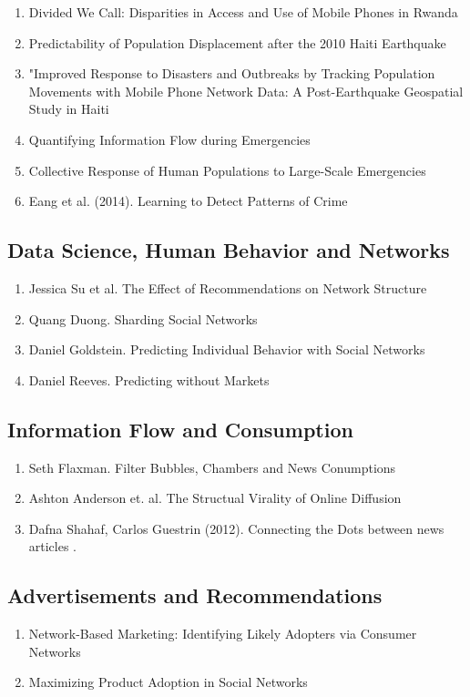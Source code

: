 \begin{enumerate}
\item Divided We Call: Disparities in Access and Use of Mobile Phones in Rwanda
\item Predictability of Population Displacement after the 2010 Haiti Earthquake
\item "Improved Response to Disasters and Outbreaks by Tracking Population Movements with Mobile Phone Network Data: A Post-Earthquake Geospatial Study in Haiti
\item Quantifying Information Flow during Emergencies
\item Collective Response of Human Populations to Large-Scale Emergencies \cite{Bagrow_2011}
\item Eang et al. (2014). Learning to Detect Patterns of Crime\cite{Wang_2013}
\end{enumerate}

\subsection{Data Science, Human Behavior and Networks}
\begin{enumerate}
\item Jessica Su et al. The Effect of Recommendations on Network Structure
\item Quang Duong. Sharding Social Networks
\item Daniel Goldstein. Predicting Individual Behavior with Social Networks
\item Daniel Reeves. Predicting without Markets
\end{enumerate}


\subsection{Information Flow and Consumption}
\begin{enumerate}
\item Seth Flaxman. Filter Bubbles, Chambers and News Conumptions
\item Ashton Anderson et. al. The Structual Virality of Online Diffusion
\item Dafna Shahaf, Carlos Guestrin (2012). Connecting the Dots between news articles . \cite{Shahaf:2012:CTD:2086737.2086744} 
\end{enumerate}

\subsection{Advertisements and Recommendations}
\begin{enumerate}
\item Network-Based Marketing: Identifying Likely Adopters via Consumer Networks
\item Maximizing Product Adoption in Social Networks\cite{Bhagat:2012:MPA:2124295.2124368}
\end{enumerate}